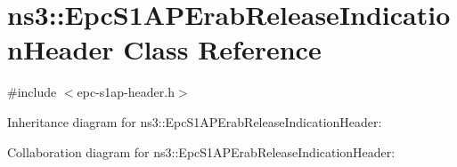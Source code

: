 \hypertarget{classns3_1_1EpcS1APErabReleaseIndicationHeader}{}\section{ns3\+:\+:Epc\+S1\+A\+P\+Erab\+Release\+Indication\+Header Class Reference}
\label{classns3_1_1EpcS1APErabReleaseIndicationHeader}


{\ttfamily \#include $<$epc-\/s1ap-\/header.\+h$>$}



Inheritance diagram for ns3\+:\+:Epc\+S1\+A\+P\+Erab\+Release\+Indication\+Header\+:


Collaboration diagram for ns3\+:\+:Epc\+S1\+A\+P\+Erab\+Release\+Indication\+Header\+:

